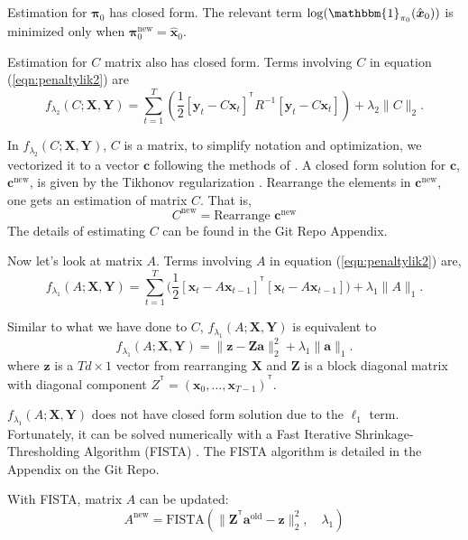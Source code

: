 \documentclass[fleqn,12pt]{article}
\let\oldref\ref
\renewcommand{\ref}[1]{(\oldref{#1})}
\newcommand{\T}{^{\ensuremath{\mathsf{T}}}}           %
\providecommand{\mb}[1]{\boldsymbol{#1}}
\newcommand{\bx}{\mb{x}}
\newcommand{\by}{\mb{y}}
\newcommand{\bX}{\mb{X}}
\newcommand{\bY}{\mb{Y}}
\begin{document}
Estimation for $\mathbf{\pi}_0$ has closed form. The relevant term $\log(\mathbbm{1}_{\mathbf{\pi}_0}(\hat{\bx}_0))$ is minimized only when $\mathbf{\pi}_0^{\text{new}} = \hat{\bx}_0$.

Estimation for $C$ matrix also has closed form. Terms involving $C$ in equation \ref{eqn:penaltylik2} are
\begin{equation*}
f_{\lambda_2}(C;\bX,\bY) = \sum\limits_{t=1}^{T}\left(\frac{1}{2}[\by_t-C\bx_t]^{\T}R^{-1}[\by_t-C\bx_t]\right)+\lambda_2 \|C\|_2.
\end{equation*}

In $f_{\lambda_2}(C;\bX,\bY)$, $C$ is a matrix, to simplify notation and optimization, we vectorized it to a vector $\mathbf{c}$ following the methods of \citet{turlach2005simultaneous}. A closed form solution for $\mathbf{c}$, $\mathbf{c}^{\text{new}}$, is given by the Tikhonov regularization \citep{tikhonov1943stability}. Rearrange the elements in $\mathbf{c}^{\text{new}}$, one gets an estimation of matrix $C$. That is,
\begin{equation}\label{eq:updatec}
C^{\text{new}} =\text{Rearrange } \mathbf{c}^{\text{new}}
\end{equation}
The details of estimating $C$ can be found in the Git Repo Appendix.

Now let's look at matrix $A$. Terms involving $A$ in equation \ref{eqn:penaltylik2} are,
\begin{equation*}
f_{\lambda_1}(A;\bX,\bY) = \sum\limits_{t=1}^{T}\big(\frac{1}{2}[\bx_t-A\bx_{t-1}]^{\T}[\bx_t-A\bx_{t-1}]\big)+\lambda_1 \|A\|_1.
\end{equation*}

Similar to what we have done to $C$, $f_{\lambda_1}(A;\bX,\bY)$ is equivalent to
\begin{equation*}
f_{\lambda_1}(A;\bX,\bY) =  \|\mathbf{z}  - \mathbf{Za}\|_2^2 + \lambda_1\|\mathbf{a}\|_1.
\end{equation*}
where $\mathbf{z}$ is a $Td \times 1$ vector from rearranging $\bX$ and $\mathbf{Z}$ is a block diagonal matrix with diagonal component $Z^{\T} =(\bx_0,\ldots,\bx_{T-1})^{\T}$.


$f_{\lambda_1}(A;\bX,\bY)$ does not have closed form solution due to the $\ell_1$ term. Fortunately, it can be solved numerically with a Fast Iterative Shrinkage-Thresholding Algorithm (FISTA) \citep{beck2009fast}. The FISTA algorithm is detailed in the Appendix on the Git Repo.

With FISTA, matrix $A$ can be updated:
\begin{equation}\label{eq:updatea}
A^{\text{new}} = \text{FISTA}(\|\mathbf{Z}^{\T}\mathbf{a}^{\text{old}} -\mathbf{z}\|_2^2,\quad \lambda_1)
\end{equation}
\end{document}
